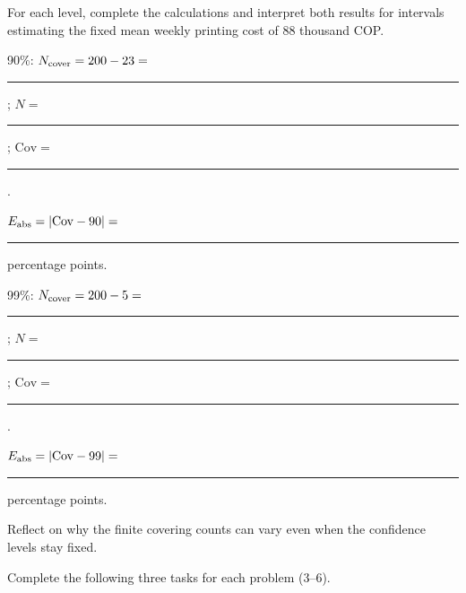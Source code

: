 \par For each level, complete the calculations and interpret both results for intervals estimating the fixed mean weekly printing cost of 88 thousand COP.
\par\noindent\begin{minipage}[t]{0.70\linewidth}
\vspace{0pt}
\par 90\%: $N_{\rm cover}=200-23=$ \rule{.5in}{.3pt}; $N=$ \rule{.4in}{.3pt}; $\mathrm{Cov}=$ \rule{1in}{.3pt}.
\par $E_{\rm abs}=|\mathrm{Cov}-90|=$ \rule{.7in}{.3pt} percentage points. 
\par 99\%: $N_{\rm cover}=200-5=$ \rule{.5in}{.3pt}; $N=$ \rule{.4in}{.3pt}; $\mathrm{Cov}=$ \rule{1in}{.3pt}.
\par $E_{\rm abs}=|\mathrm{Cov}-99|=$ \rule{.7in}{.3pt} percentage points. 
\end{minipage}\hfill
\begin{minipage}[t]{0.28\linewidth}
\vspace{0pt}
\par Reflect on why the finite covering counts can vary even when the confidence levels stay fixed.
\end{minipage}\par


Complete the following three tasks for each problem (3--6).



